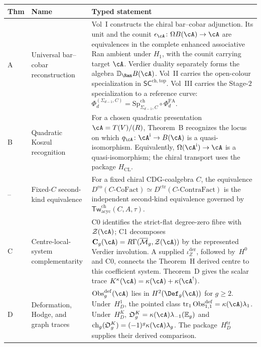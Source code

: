 \begin{center}
\renewcommand{\arraystretch}{1.35}
\begin{tabular}{|p{1.1cm}|p{4.0cm}|p{8.4cm}|}
\hline
\textbf{Thm} & \textbf{Name} & \textbf{Typed statement} \\
\hline\hline
A & Universal bar--cobar reconstruction &
Vol~I constructs the chiral bar--cobar adjunction.  Its unit and the
counit
$\epsilon_\cA\colon\Omega B(\cA)\to\cA$ are equivalences in the
complete enhanced associative Ran ambient under $H_1$, with the
counit carrying target $\cA$.  Verdier duality separately forms the
algebra $\mathbb D_{\Ran}B(\cA)$.  Vol~II carries the open-colour
specialization in $\mathsf{SC}^{\mathrm{ch,top}}$.  Vol~III carries the
Stage-$2$ specialization to a reference curve:
$\Phi_d^{(\Sigma_{d-1},C)}
=\mathrm{Sp}^{\mathrm{ch}}_{\Sigma_{d-1},C}\circ\Phi_d^{\mathrm{FA}}$. \\
\hline
B & Quadratic Koszul recognition &
For a chosen quadratic presentation
$\cA=T(V)/(R)$, Theorem~B recognizes the locus on which
$q_\cA\colon\cA^{\mathrm i}\to B(\cA)$ is a quasi-isomorphism.
Equivalently, $\Omega(\cA^{\mathrm i})\to\cA$ is a quasi-isomorphism;
the chiral transport uses the package $H_{\mathrm{CL}}$. \\
\hline
-- & Fixed-$C$ second-kind equivalence &
For a fixed chiral CDG-coalgebra $C$, the equivalence
$D^{\mathrm{co}}(C\text{-}\mathrm{CoFact})\simeq
D^{\mathrm{ctr}}(C\text{-}\mathrm{ContraFact})$
is the independent second-kind equivalence governed by
$\mathsf{Tw}^{\mathrm{ch}}_{\mathrm{acyc}}(C,A,\tau)$. \\
\hline
C & Centre-local-system complementarity &
C0 identifies the strict-flat degree-zero fibre with
$\mathcal Z(\cA)$; C1 decomposes
$\mathbf C_g(\cA)=R\Gamma(\overline{\mathcal M}_g,\mathcal Z(\cA))$
by the represented Verdier involution.  A supplied
$\iota_Z^{\mathrm{der}}$, followed by~$H^0$ and C0, connects the
Theorem~H derived centre to this coefficient system.  Theorem~D gives
the scalar trace
$K^\kappa(\cA)=\kappa(\cA)+\kappa(\cA^!)$. \\
\hline
D & Deformation, Hodge, and graph traces &
$\operatorname{Obs}^{\mathrm{def}}_g(\cA)$ lies in
$H^2(\Def_g(\cA))$ for $g\geq2$.  Under~$H_D^1$, the pointed class
$\operatorname{tr}_1\operatorname{Obs}^{\mathrm{def}}_{1,1}
=\kappa(\cA)\lambda_1$.  Under~$H_D^K$,
$\mathfrak O_g^K=\kappa(\cA)\lambda_{-1}(\mathbb E_g)$ and
$\operatorname{ch}_g(\mathfrak O_g^K)=(-1)^g\kappa(\cA)\lambda_g$.
The package~$H_D^{\mathrm{tr}}$ supplies their derived comparison.

\end{tabular}
\end{center}
